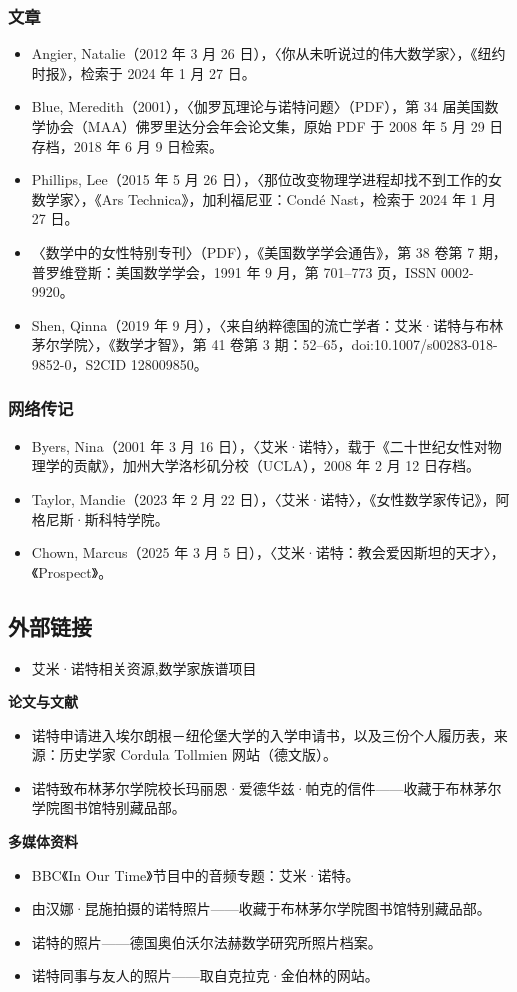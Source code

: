 \subsubsection{文章}
\begin{itemize}
\item Angier, Natalie（2012 年 3 月 26 日），〈你从未听说过的伟大数学家〉，《纽约时报》，检索于 2024 年 1 月 27 日。
\item Blue, Meredith（2001），〈伽罗瓦理论与诺特问题〉（PDF），第 34 届美国数学协会（MAA）佛罗里达分会年会论文集，原始 PDF 于 2008 年 5 月 29 日存档，2018 年 6 月 9 日检索。
\item Phillips, Lee（2015 年 5 月 26 日），〈那位改变物理学进程却找不到工作的女数学家〉，《Ars Technica》，加利福尼亚：Condé Nast，检索于 2024 年 1 月 27 日。
\item 〈数学中的女性特别专刊〉（PDF），《美国数学学会通告》，第 38 卷第 7 期，普罗维登斯：美国数学学会，1991 年 9 月，第 701–773 页，ISSN 0002-9920。
\item Shen, Qinna（2019 年 9 月），〈来自纳粹德国的流亡学者：艾米·诺特与布林茅尔学院〉，《数学才智》，第 41 卷第 3 期：52–65，doi:10.1007/s00283-018-9852-0，S2CID 128009850。
\end{itemize}
\subsubsection{网络传记}
\begin{itemize}
\item Byers, Nina（2001 年 3 月 16 日），〈艾米·诺特〉，载于《二十世纪女性对物理学的贡献》，加州大学洛杉矶分校（UCLA），2008 年 2 月 12 日存档。
\item Taylor, Mandie（2023 年 2 月 22 日），〈艾米·诺特〉，《女性数学家传记》，阿格尼斯·斯科特学院。
\item Chown, Marcus（2025 年 3 月 5 日），〈艾米·诺特：教会爱因斯坦的天才〉，《Prospect》。
\end{itemize}
\subsection{外部链接}
\begin{itemize}
\item 艾米·诺特相关资源,数学家族谱项目
\end{itemize}
\textbf{论文与文献}
\begin{itemize}
\item 诺特申请进入埃尔朗根－纽伦堡大学的入学申请书，以及三份个人履历表，来源：历史学家 Cordula Tollmien 网站（德文版）。
\item 诺特致布林茅尔学院校长玛丽恩·爱德华兹·帕克的信件——收藏于布林茅尔学院图书馆特别藏品部。
\end{itemize}
\textbf{多媒体资料}
\begin{itemize}
\item BBC《In Our Time》节目中的音频专题：艾米·诺特。
\item 由汉娜·昆施拍摄的诺特照片——收藏于布林茅尔学院图书馆特别藏品部。
\item 诺特的照片——德国奥伯沃尔法赫数学研究所照片档案。
\item 诺特同事与友人的照片——取自克拉克·金伯林的网站。
\end{itemize}

